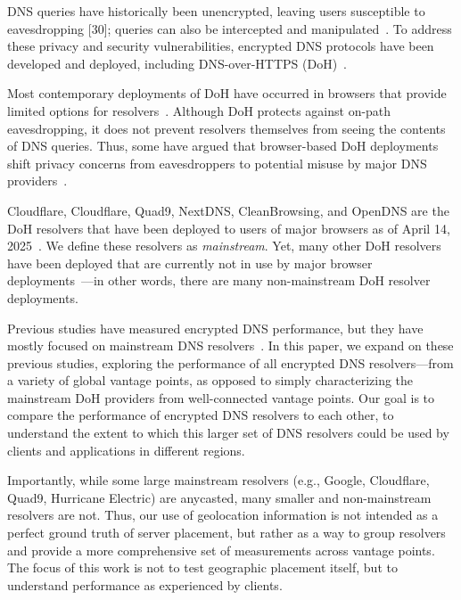 DNS queries have historically been unencrypted, leaving users susceptible to eavesdropping [30]; queries can also be intercepted and manipulated~\cite{jones2016detecting}. To address these privacy and security vulnerabilities, encrypted DNS protocols have been developed and deployed, including DNS-over-HTTPS (DoH)~\cite{rfc8484}.

Most contemporary deployments of DoH have occurred in browsers that provide limited options for resolvers~\cite{chromeResolvers,ffChoices}. Although DoH protects against on-path eavesdropping, it does not prevent resolvers themselves from seeing the contents of DNS queries. Thus, some have argued that browser-based DoH deployments shift privacy concerns from eavesdroppers to potential misuse by major DNS providers~\cite{vixie}.

Cloudflare, Cloudflare, Quad9, NextDNS, CleanBrowsing, and OpenDNS are the DoH resolvers that have been deployed
to users of major browsers as of April 14,
2025~\cite{bravebrowser,edgebrowser,ffbrowser,chromebrowser,operabrowser}.  We
define these resolvers as {\em
mainstream}.
Yet, many other DoH resolvers have been deployed that are currently
not in use by major browser deployments~\cite{dnscrypt}---in other words,
there are many non-mainstream DoH resolver deployments.  

Previous studies have measured encrypted DNS performance, but they have mostly focused on mainstream DNS resolvers~\cite{hounsel2020comparing,hounsel2021can,hoang2020k,lu2019end-to-end}.
In this paper, we expand on these previous studies, exploring the performance of all encrypted DNS resolvers—from a variety of global
vantage points, as opposed to simply characterizing the mainstream DoH providers from well-connected vantage points. Our goal is to compare the performance of encrypted DNS resolvers to each other, to understand the extent to which this larger set of DNS resolvers could be used by clients and applications in different regions. 

Importantly, while some large mainstream resolvers (e.g., Google, Cloudflare, Quad9, Hurricane Electric) are anycasted, many smaller and non-mainstream resolvers are not. Thus, our use of geolocation information is not intended as a perfect ground truth of server placement, but rather as a way to group resolvers and provide a more comprehensive set of measurements across vantage points. The focus of this work is not to test geographic placement itself, but to understand performance as experienced by clients.

